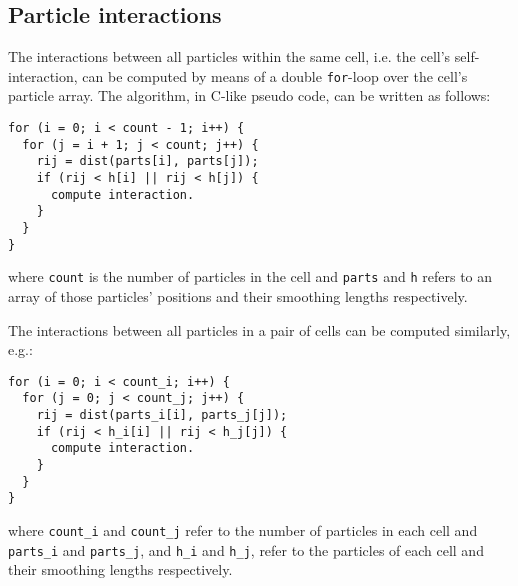 \documentclass[final]{siamltex}
\begin{document}
\subsection{Particle interactions}

The interactions between all particles within the same cell,
i.e. the cell's self-interaction, can be computed by means of
a double {\tt for}-loop over the cell's particle array.
The algorithm, in C-like pseudo code, can be written as follows:

\begin{center}\begin{minipage}{0.8\textwidth}
    \begin{lstlisting}
for (i = 0; i < count - 1; i++) {
  for (j = i + 1; j < count; j++) {
    rij = dist(parts[i], parts[j]);
    if (rij < h[i] || rij < h[j]) {
      compute interaction.
    }
  }
}
    \end{lstlisting}
\end{minipage}\end{center}

\noindent where {\tt count} is the number of particles in the
cell and {\tt parts} and {\tt h} refers to an array of those
particles' positions and their smoothing lengths respectively.

The interactions between all particles in a pair of cells
can be computed similarly, e.g.:
   
\begin{center}\begin{minipage}{0.8\textwidth}
    \begin{lstlisting}
for (i = 0; i < count_i; i++) {
  for (j = 0; j < count_j; j++) {
    rij = dist(parts_i[i], parts_j[j]);
    if (rij < h_i[i] || rij < h_j[j]) {
      compute interaction.
    }
  }
}
    \end{lstlisting}
\end{minipage}\end{center}

\noindent where {\tt count\_i} and {\tt count\_j} refer to
the number of particles in each cell and {\tt parts\_i} and
{\tt parts\_j}, and {\tt h\_i} and {\tt h\_j}, refer to the
particles of each cell and their smoothing lengths respectively.
\end{document}
